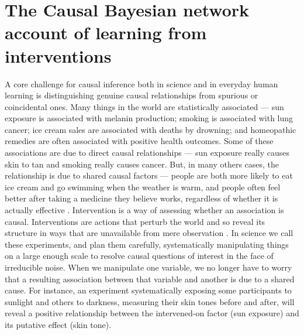 \documentclass{cambridge7A}%
\newcommand{\ttodo}[2][]{\vspace{0.1cm} \hfil \todo[caption={\textbf{TG}}, size=\footnotesize, color = orange, inline, #1]{#2}}
\begin{document}
\section{The Causal Bayesian network account of learning from interventions}\label{section:CBN}

A core challenge for causal inference both in science and in everyday human learning is distinguishing genuine causal relationships from spurious or coincidental ones.  Many things in the world are statistically associated --- sun exposure is associated with melanin production; smoking is associated with lung cancer;  %
ice cream sales are associated with deaths by drowning; and homeopathic remedies are often associated with positive health outcomes.  Some of these associations are due to direct causal relationships --- sun exposure really causes skin to tan and smoking really causes cancer. %
But, in many others cases, the relationship is due to shared causal factors --- people are both more likely to eat ice cream and go swimming when the weather is warm, %
and people often feel better after taking a medicine they believe works, regardless of whether it is actually effective \citep{di2001influence}.  Intervention is a way of assessing whether an association is causal.  Interventions are actions that perturb the world and so reveal its structure in ways that are unavailable from mere observation \citep{woodward2003making}.  In science we call these experiments, and plan them carefully, systematically manipulating things on a large enough scale to resolve causal questions of interest in the face of irreducible noise.  When we manipulate one variable, we no longer have to worry that a resulting association between that variable and another is due to a shared cause.  For instance, an experiment systematically exposing some participants to sunlight and others to darkness, measuring their skin tones before and after, will reveal a positive relationship between the intervened-on factor (sun exposure) and its putative effect (skin tone).  %
\end{document}
